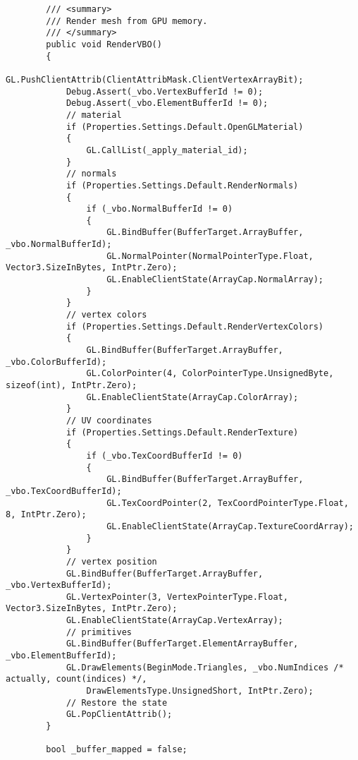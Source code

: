\begin{scriptsize}
\begin{verbatim}
        /// <summary>
        /// Render mesh from GPU memory.
        /// </summary>
        public void RenderVBO()
        {
            GL.PushClientAttrib(ClientAttribMask.ClientVertexArrayBit);
            Debug.Assert(_vbo.VertexBufferId != 0);
            Debug.Assert(_vbo.ElementBufferId != 0);
            // material
            if (Properties.Settings.Default.OpenGLMaterial)
            {
                GL.CallList(_apply_material_id);
            }
            // normals
            if (Properties.Settings.Default.RenderNormals)
            {
                if (_vbo.NormalBufferId != 0)
                {
                    GL.BindBuffer(BufferTarget.ArrayBuffer, _vbo.NormalBufferId);
                    GL.NormalPointer(NormalPointerType.Float, Vector3.SizeInBytes, IntPtr.Zero);
                    GL.EnableClientState(ArrayCap.NormalArray);
                }
            }
            // vertex colors
            if (Properties.Settings.Default.RenderVertexColors)
            {
                GL.BindBuffer(BufferTarget.ArrayBuffer, _vbo.ColorBufferId);
                GL.ColorPointer(4, ColorPointerType.UnsignedByte, sizeof(int), IntPtr.Zero);
                GL.EnableClientState(ArrayCap.ColorArray);
            }
            // UV coordinates
            if (Properties.Settings.Default.RenderTexture)
            {
                if (_vbo.TexCoordBufferId != 0)
                {
                    GL.BindBuffer(BufferTarget.ArrayBuffer, _vbo.TexCoordBufferId);
                    GL.TexCoordPointer(2, TexCoordPointerType.Float, 8, IntPtr.Zero);
                    GL.EnableClientState(ArrayCap.TextureCoordArray);
                }
            }
            // vertex position
            GL.BindBuffer(BufferTarget.ArrayBuffer, _vbo.VertexBufferId);
            GL.VertexPointer(3, VertexPointerType.Float, Vector3.SizeInBytes, IntPtr.Zero);
            GL.EnableClientState(ArrayCap.VertexArray);
            // primitives
            GL.BindBuffer(BufferTarget.ElementArrayBuffer, _vbo.ElementBufferId);
            GL.DrawElements(BeginMode.Triangles, _vbo.NumIndices /* actually, count(indices) */,
                DrawElementsType.UnsignedShort, IntPtr.Zero);
            // Restore the state
            GL.PopClientAttrib();
        }

        bool _buffer_mapped = false;


\end{verbatim}
\end{scriptsize}
